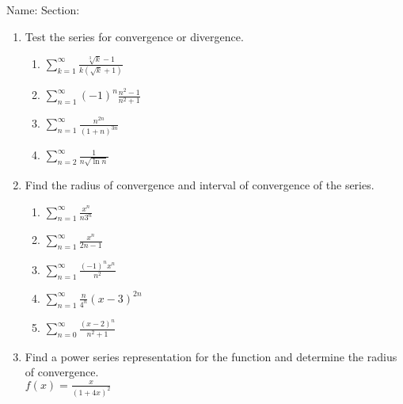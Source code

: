 \documentclass[12pt]{article}
\begin{document}
\noindent Name: \hspace{4in}Section:
\vspace{0.5cm}



\begin{enumerate}
\item Test the series for convergence or divergence.
\begin{enumerate}
\item $\sum_{k=1}^{\infty}\frac{\sqrt[3]{k}-1}{k(\sqrt{k}+1)}$
\vfill

\item $\sum_{n=1}^\infty (-1)^n \frac{n^2-1}{n^2+1}$
\vfill
\item $\sum_{n=1}^{\infty} \frac{n^{2n}}{(1+n)^{3n}}$
\vfill
\newpage

\item $\sum_{n=2}^\infty \frac{1}{n \sqrt{\ln{n}}}$
\vfill


\end{enumerate}



\item Find the radius of convergence and interval of convergence of the series.
\begin{enumerate}
\item $\sum_{n=1}^{\infty}\frac{x^n}{n3^n}$
\vfill
\newpage
\item $\sum_{n=1}^{\infty}\frac{x^n}{2n-1} $
\vfill
\item $\sum_{n=1}^{\infty}\frac{(-1)^nx^n}{n^2} $
\vfill
\newpage
\item $\sum_{n=1}^{\infty}\frac{n}{4^n}(x-3)^{2n} $
\vfill
\item $\sum_{n=0}^{\infty}\frac{(x-2)^n}{n^2+1} $
\vfill
\end{enumerate}
\item Find a power series representation for the function and determine the radius of convergence.\\
$f(x)=\frac{x}{(1+4x)^2}$
\vfill



\end{enumerate}
\end{document}
